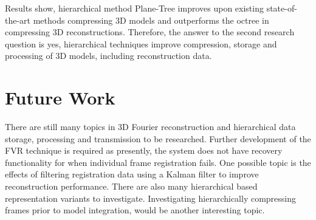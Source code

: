 Results show, hierarchical method Plane-Tree improves upon existing state-of-the-art methods compressing 3D models and outperforms the octree in compressing 3D reconstructions. Therefore, the answer to the second research question is yes, hierarchical techniques improve compression, storage and processing of 3D models, including reconstruction data. \\

\section{Future Work}

There are still many topics in 3D Fourier reconstruction and hierarchical data storage, processing and transmission to be researched. Further development of the FVR technique is required as presently, the system does not have recovery functionality for when individual frame registration fails. One possible topic is the effects of filtering registration data using a Kalman filter to improve reconstruction performance. There are also many hierarchical based representation variants to investigate. Investigating hierarchically compressing frames prior to model integration, would be another interesting topic. \\
